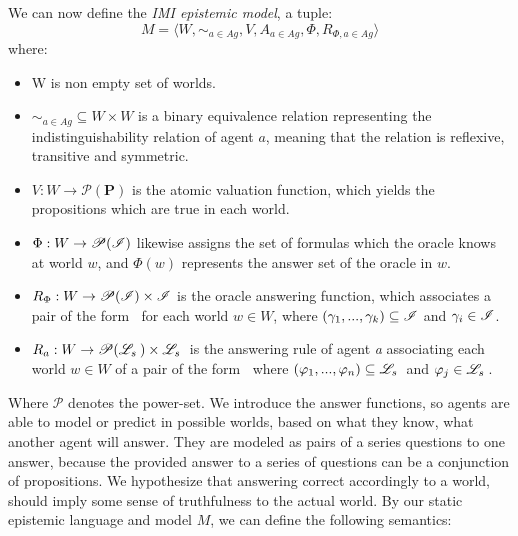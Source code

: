 We can now define the \textit{IMI epistemic model}, a tuple:
$$
	M = \langle W, \sim_{a\in Ag}, V, A_{a\in Ag}, \Phi, R_{\Phi
		,a\in Ag}\rangle
$$
where:
\begin{itemize}
	\setlength\itemsep{-0.4em}
	\item W is non empty set of worlds.
	\item $\sim_{a\in Ag} \subseteq W \times W$ is a binary equivalence relation representing the indistinguishability relation of agent $a$, meaning that the relation is reflexive, transitive and symmetric.
	\item $V : W \rightarrow \mathscr{P}(\mathbf{P})$ is the atomic valuation function, which yields the propositions which are true in each world. 
	\item $\Phi : W \rightarrow \mathscr{P}(\mathscr{I}) $ likewise assigns the set of formulas which the oracle knows at world $w$, and $\Phi(w)$ represents the answer set of the oracle in $w$.
	\item $R_{\Phi} : W \rightarrow \mathscr{P}(\mathscr{I}) \times \mathscr{I}$ is the oracle answering function, which associates a pair of the form \oset $\:$ for each world $w \in W$, where $(\gamma_1,...,\gamma_k) \subseteq \mathscr{I}$ and $\gamma_i \in \mathscr{I}$.
	\item $R_a : W \rightarrow \mathscr{P}(\mathscr{L}_s \:) \times \mathscr{L}_s \:$ is the answering rule of agent \textit{a} associating each world $w \in W$ of a pair of the form \aset $\:$ where $(\varphi_1,...,\varphi_n) \subseteq \mathscr{L}_s \:$ and $\varphi_j \in \mathscr{L}_s \:$.
\end{itemize}
Where $\mathscr{P}$ denotes the power-set. We introduce the answer functions, so agents are able to model or predict in possible worlds, based on what they know, what another agent will answer. They are modeled as pairs of a series questions to one answer, because the provided answer to a series of questions can be a conjunction of propositions. We hypothesize that answering correct accordingly to a world, should imply some sense of truthfulness to the actual world. By our static epistemic language \staticlang and model $M$, we can define the following semantics:

